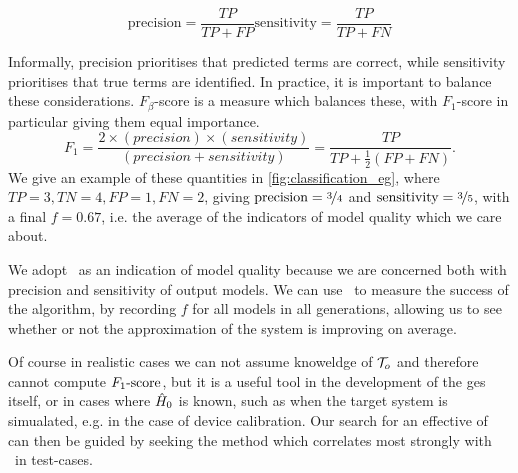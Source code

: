 \begin{subequations}
    \begin{equation}
        \label{eqn:precision}
        \text{precision} = \frac{TP}{TP + FP}
    \end{equation}
       
    \begin{equation}
        \label{eqn:sensitivity}
        \text{sensitivity} = \frac{TP}{TP + FN}
    \end{equation}
\end{subequations}

Informally, precision prioritises that predicted terms are correct, 
    while sensitivity prioritises that true terms are identified. 
In practice, it is important to balance these considerations. 
$F_{\beta}$-score is a measure which balances these, with $F_1$-score in particular giving them equal importance. 
\begin{equation}
    \label{eqn:f1_score}
    F_1 = \frac{2\times (precision)\times(sensitivity)}{(precision + sensitivity)} = \frac{TP}{TP + \frac{1}{2}(FP + FN)}.
\end{equation}
We give an example of these quantities in \cref{fig:classification_eg}, 
    where $TP=3, TN=4, FP=1, FN=2$, giving $\textrm{precision} = \nicefrac{3}{4}$ 
    and $\textrm{sensitivity} = \nicefrac{3}{5}$, 
    with a final $f = 0.67$, i.e. the average of the indicators of model quality which we care about. 
\par 

We adopt \fs \ as an indication of model quality because we are concerned both with precision and sensitivity
    of output models. 
We can use \fs \ to measure the success of the algorithm,
    by recording $f$ for all models in all generations, allowing us to 
    see whether or not the approximation of the system is improving on average. 

Of course in realistic cases we can not assume knoweldge of $\mathcal{T}_o$ and therefore cannot compute 
    $ F_{1}\text{-score} $, but it is a useful tool in the development of the \gls{ges} itself, 
    or in cases where $\hat{H}_0$ is known, such as when the target system is simualated, e.g. in the case of device calibration.
Our search for an effective \gls{of} can then be guided by seeking the 
    method which correlates most strongly with \fs \ in test-cases.

